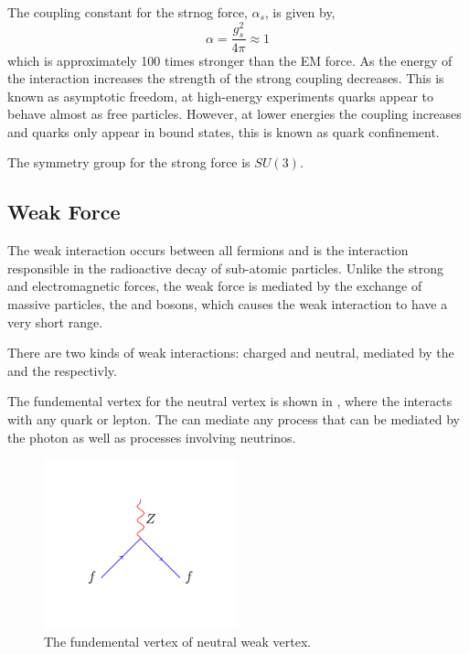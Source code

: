 The coupling constant for the strnog force, $\alpha_s$, is given by,
\begin{equation}
\alpha = \frac{g_s^2}{4 \pi} \approx 1
\end{equation}
which is approximately 100 times stronger than the \ac{EM} force.
As the energy of the interaction increases the strength of the strong coupling
decreases. This is known as asymptotic freedom, at high-energy experiments
quarks appear to behave almost as free particles. However, at lower energies 
the coupling increases and quarks only appear in bound states, this is known as
quark confinement.

The symmetry group for the strong force is $SU(3)$. 

\subsection{Weak Force}
The weak interaction occurs between all fermions and is the interaction
responsible in the radioactive decay of sub-atomic particles.  Unlike the strong
and electromagnetic forces, the weak force is mediated by the exchange of
massive particles, the \PWpm and \PZ bosons, which causes the weak interaction
to have a very short range.

There are two kinds of weak interactions: charged and neutral, mediated by the
\PW and the \PZ respectivly.

The fundemental vertex for the neutral vertex is shown in
, where the \PZ interacts with any quark or lepton.
The \PZ can mediate any process that can be mediated by the photon as well as
processes involving neutrinos.
\begin{figure}[htbp]
  \centering
  \includegraphics[width=0.5\textwidth]{weak_neut_process}
  \caption{The fundemental vertex of neutral weak vertex.}
  \label{fig:neutral}
\end{figure}

